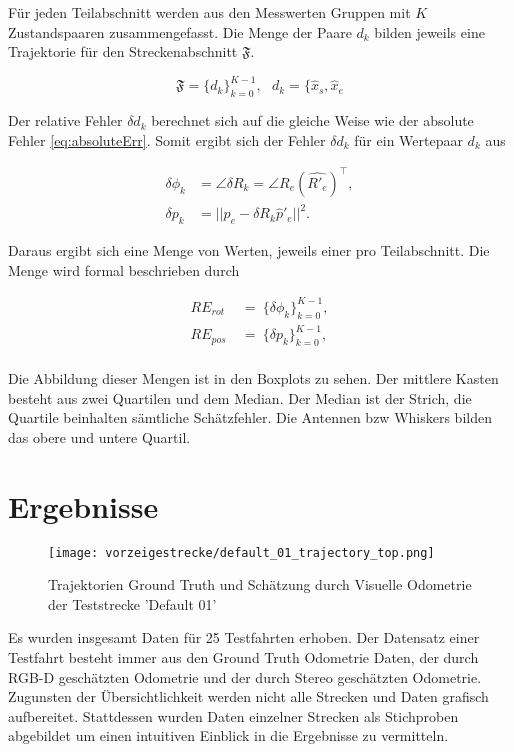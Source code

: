 Für jeden Teilabschnitt werden aus den Messwerten Gruppen mit $K$ Zustandspaaren zusammengefasst. Die Menge der Paare $d_k$ bilden jeweils eine Trajektorie für den Streckenabschnitt $\mathfrak{F}$. 

\begin{equation}
	\mathfrak{F} = \{d_k\}^{K-1}_{k=0}, \:\:\: d_k= \{ \hat{x}_s, \hat{x}_e
\end{equation}

Der relative Fehler $\delta d_k$ berechnet sich auf die gleiche Weise wie der absolute Fehler \ref{eq:absoluteErr}. Somit ergibt sich der Fehler $\delta d_k$  für ein Wertepaar $d_k$ aus

\begin{align}
	\delta \phi_k & = \angle \delta R_k = \angle R_e(\hat{R'_e})^\top,\\
	\delta p_k &= ||p_e - \delta R_k \hat{p}'_e||^2.
\end{align}

Daraus ergibt sich eine Menge von Werten, jeweils einer pro Teilabschnitt. Die Menge wird formal beschrieben durch 

\begin{align}
	RE_{rot} \: &= \: \{\delta \phi_k\}^{K-1}_{k=0},\\
	RE_{pos} \: &= \: \{\delta p_k\}^{K-1}_{k=0},\\
\end{align}

Die Abbildung dieser Mengen ist in den Boxplots zu sehen. Der mittlere Kasten besteht aus zwei Quartilen und dem Median. Der Median ist der Strich, die Quartile beinhalten sämtliche Schätzfehler. Die Antennen bzw Whiskers bilden das obere und untere Quartil.

\newpage
\section{Ergebnisse}
\begin{figure}[!ht]
	\centering
	\texttt{[image: vorzeigestrecke/default\_01\_trajectory\_top.png]}
	\caption[Plot der Trajektorien Teststrecke 'Default 01']{Trajektorien Ground Truth und Schätzung durch Visuelle Odometrie der Teststrecke 'Default 01'}
\end{figure}

Es wurden insgesamt Daten für 25 Testfahrten erhoben. Der Datensatz einer Testfahrt besteht immer aus den Ground Truth Odometrie Daten, der durch RGB-D geschätzten Odometrie und der durch Stereo geschätzten Odometrie. Zugunsten der Übersichtlichkeit werden nicht alle Strecken und Daten grafisch aufbereitet. Stattdessen wurden Daten einzelner Strecken als Stichproben abgebildet um einen intuitiven Einblick in die Ergebnisse zu vermitteln. 

